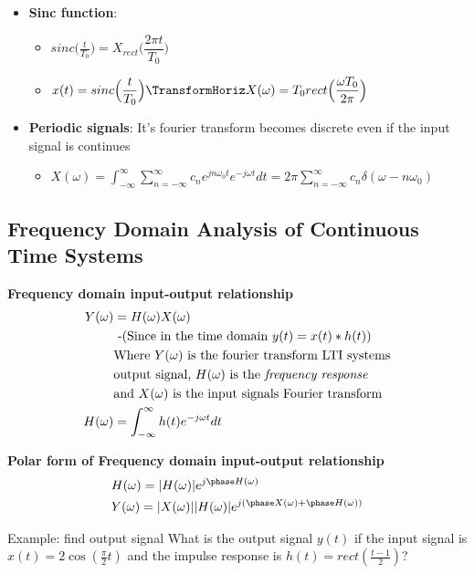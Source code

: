 \begin{multicols}{2}
\begin{itemize}
    \item \textbf{Sinc function}:
    \begin{itemize}
        \item $sinc\Big( \frac{t}{T_0} \Big) = X_{rect}\Big( \dfrac{2\pi t}{T_0} \Big)$
        \item $x(t) = sinc\Big( \dfrac{t}{T_0} \Big) \TransformHoriz X(\omega) = T_0 rect\Big( \dfrac{\omega T_0}{2\pi} \Big)$
    \end{itemize}
    \item \textbf{Periodic signals}: It's fourier transform becomes discrete even if the input signal is continues
    \begin{itemize}
        \item $X(\omega) = \int_{-\infty}^{\infty} \sum_{n=-\infty}^{\infty} c_n e^{jn\omega_0 t} e^{-j\omega t} dt = 2\pi\sum_{n=-\infty}^{\infty} c_n \delta(\omega -n\omega_0)$
    \end{itemize}
\end{itemize}


\subsection{Frequency Domain Analysis of Continuous Time Systems}
\textbf{Frequency domain input-output relationship}
\begin{align*}
    Y(\omega) &= H(\omega)X(\omega) \\ 
    &\text{ -(Since in the time domain $y(t)=x(t)*h(t)$)} \\
    &\text{Where $Y(\omega)$ is the fourier transform LTI systems} \\
    &\text{output signal, $H(\omega)$ is the \textit{frequency response}} \\
    &\text{and $X(\omega)$ is the input signals Fourier transform} \\
    H(\omega) &= \int_{-\infty}^{\infty} h(t)e^{-j\omega t} dt
\end{align*}

\noindent\textbf{Polar form of Frequency domain input-output relationship}
\begin{align*}
    &H(\omega) = |H(\omega)|e^{j\phase H(\omega)} \\
    &Y(\omega) = |X(\omega)||H(\omega)|e^{j(\phase X(\omega) + \phase H(\omega))}
\end{align*}

\begin{exampleblock}{Example: find output signal}
  What is the output signal $y(t)$ if the input signal is $x(t)=2\cos\left(\frac{\pi}{2}t\right)$
  and the impulse response is $h(t)=rect\left(\frac{t-1}{2}\right)$?


\end{exampleblock}
\end{multicols}
